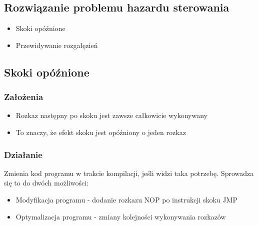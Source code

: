 \documentclass[a4paper,twoside]{article}
\begin{document}
    	\subsection*{Rozwiązanie problemu hazardu sterowania}
    	\begin{itemize}
    		\item Skoki opóźnione
    		\item Przewidywanie rozgałęzień
    	\end{itemize}
    	\subsection*{Skoki opóźnione}
    	\subsubsection*{Założenia}
    	\begin{itemize}
    		\item Rozkaz następny po skoku jest zawsze całkowicie wykonywany
    		\item To znaczy, że efekt skoku jest opóźniony o jeden rozkaz
    	\end{itemize}
    	\subsubsection*{Działanie}
    	Zmienia kod programu w trakcie kompilacji, jeśli widzi taka potrzebę. Sprowadza się to do dwóch możliwości:
    	\begin{itemize}
    		\item Modyfikacja programu - dodanie rozkazu NOP po instrukcji skoku JMP
    		\item Optymalizacja programu - zmiany kolejności wykonywania rozkazów
    	\end{itemize}
\end{document}
